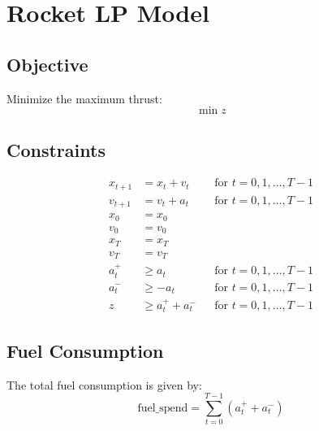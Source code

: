 \documentclass{article}
\begin{document}
\section*{Rocket LP Model}

\subsection*{Objective}
Minimize the maximum thrust:
\[
\min z
\]

\subsection*{Constraints}
\begin{align}
x_{t+1} &= x_t + v_t && \text{for } t = 0, 1, \ldots, T-1 \\
v_{t+1} &= v_t + a_t && \text{for } t = 0, 1, \ldots, T-1 \\
x_0 &= x_0 \\
v_0 &= v_0 \\
x_T &= x_T \\
v_T &= v_T \\
a_t^+ &\geq a_t \quad && \text{for } t = 0, 1, \ldots, T-1 \\
a_t^- &\geq -a_t \quad && \text{for } t = 0, 1, \ldots, T-1 \\
z &\geq a_t^+ + a_t^- && \text{for } t = 0, 1, \ldots, T-1
\end{align}

\subsection*{Fuel Consumption}
The total fuel consumption is given by:
\[
\text{fuel\_spend} = \sum_{t=0}^{T-1} (a_t^+ + a_t^-)
\]
\end{document}

